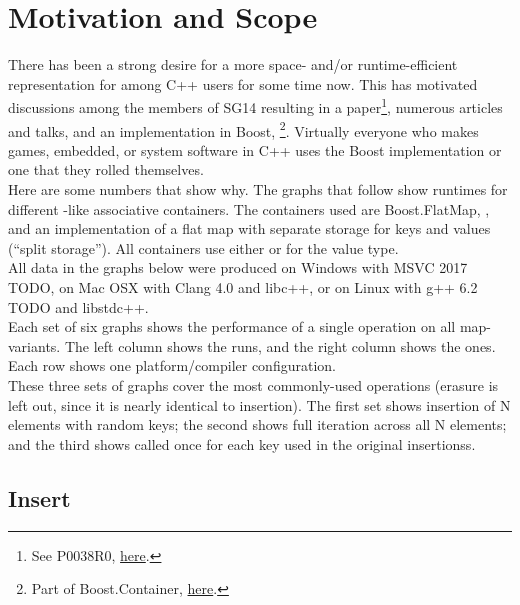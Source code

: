 \section{Motivation and Scope}

There has been a strong desire for a more space- and/or runtime-efficient
representation for  among C++ users for some time now.  This has
motivated discussions among the members of SG14 resulting in a
paper\footnote{See P0038R0,
  \href{http://www.open-std.org/jtc1/sc22/wg21/docs/papers/2015/p0038r0.html}{here}.},
numerous articles and talks, and an implementation in Boost,
\footnote{Part of Boost.Container,
  \href{http://www.boost.org/doc/libs/1_61_0/doc/html/container.html}{here}.}.
Virtually everyone who makes games, embedded, or system software in C++ uses
the Boost implementation or one that they rolled themselves.\\

Here are some numbers that show why.  The graphs that follow show runtimes for
different -like associative containers.  The containers used are
Boost.FlatMap, , and an implementation of a flat map with separate
 storage for keys and values (``split storage'').  All containers
use either  or 
for the value type.\\

All data in the graphs below were produced on Windows with MSVC 2017 TODO, on
Mac OSX with Clang 4.0 and libc++, or on Linux with g++ 6.2 TODO and libstdc++.\\

Each set of six graphs shows the performance of a single operation on all
map-variants.  The left column shows the  runs, and the right
column shows the  ones.  Each row shows one
platform/compiler configuration. \\

These three sets of graphs cover the most commonly-used operations (erasure is
left out, since it is nearly identical to insertion).  The first set shows
insertion of N elements with random keys; the second shows full iteration
across all N elements; and the third shows  called
once for each key used in the original insertionss.\\

\subsection{Insert}

